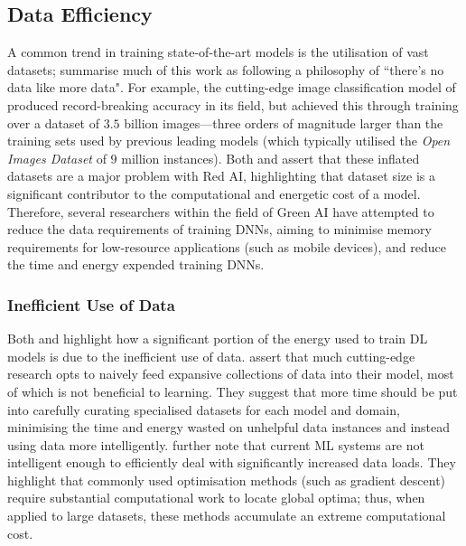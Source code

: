 \documentclass[a4paper, 11pt]{report}
\begin{document}
    \subsection{Data Efficiency}

    A common trend in training state-of-the-art models is the utilisation of vast datasets; \citet{bender-2021} summarise much of this work as following a philosophy of ``there's no data like more data". For example, the cutting-edge image classification model of \citet{mahajan-2018} produced record-breaking accuracy in its field, but achieved this through training over a dataset of $3.5$ billion images---three orders of magnitude larger than the training sets used by previous leading models (which typically utilised the \emph{Open Images Dataset} of $9$ million instances). Both \citet{schwartz-2019} and \citet{bender-2021} assert that these inflated datasets are a major problem with Red AI, highlighting that dataset size is a significant contributor to the computational and energetic cost of a model. Therefore, several researchers within the field of Green AI have attempted to reduce the data requirements of training DNNs, aiming to minimise memory requirements for low-resource applications (such as mobile devices), and reduce the time and energy expended training DNNs.


    \subsubsection{Inefficient Use of Data}

    Both \citet{bender-2021} and \citet{walsh-2021} highlight how a significant portion of the energy used to train DL models is due to the inefficient use of data. \citet{bender-2021} assert that much cutting-edge research opts to naively feed expansive collections of data into their model, most of which is not beneficial to learning. They suggest that more time should be put into carefully curating specialised datasets for each model and domain, minimising the time and energy wasted on unhelpful data instances and instead using data more intelligently. \citet{aljarrah-2015} further note that current ML systems are not intelligent enough to efficiently deal with significantly increased data loads. They highlight that commonly used optimisation methods (such as gradient descent) require substantial computational work to locate global optima; thus, when applied to large datasets, these methods accumulate an extreme computational cost.
\end{document}
